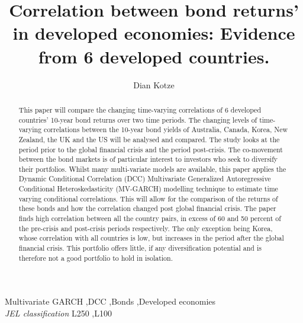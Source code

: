 \documentclass[11pt,preprint, authoryear]{elsarticle}
\numberwithin{equation}{section}
\numberwithin{figure}{section}
\numberwithin{table}{section}
\begin{document}
\begin{frontmatter}  %

\title{Correlation between bond returns' in developed economies: Evidence from
6 developed countries.}





\author[Add1]{Dian Kotze}





\address[Add1]{Stellenbosch University, Stellenbosch, South Africa}


\begin{abstract}
\small{
This paper will compare the changing time-varying correlations of 6
developed countries' 10-year bond returns over two time periods. The
changing levels of time-varying correlations between the 10-year bond
yields of Australia, Canada, Korea, New Zealand, the UK and the US will
be analysed and compared. The study looks at the period prior to the
global financial crisis and the period post-crisis. The co-movement
between the bond markets is of particular interest to investors who seek
to diversify their portfolios. Whilst many multi-variate models are
available, this paper applies the Dynamic Conditional Correlation (DCC)
Multivariate Generalized Autoregressive Conditional Heteroskedasticity
(MV-GARCH) modelling technique to estimate time varying conditional
correlations. This will allow for the comparison of the returns of these
bonds and how the correlation changed post global financial crisis. The
paper finds high correlation between all the country pairs, in excess of
60 and 50 percent of the pre-crisis and post-crisis periods
respectively. The only exception being Korea, whose correlation with all
countries is low, but increases in the period after the global financial
crisis. This portfolio offers little, if any diversification potential
and is therefore not a good portfolio to hold in isolation.
}
\end{abstract}

\vspace{1cm}

\begin{keyword}
\footnotesize{
Multivariate GARCH \sep DCC \sep Bonds \sep Developed economies \\ \vspace{0.3cm}
\textit{JEL classification} L250 \sep L100
}
\end{keyword}
\vspace{0.5cm}
\end{frontmatter}
\end{document}

